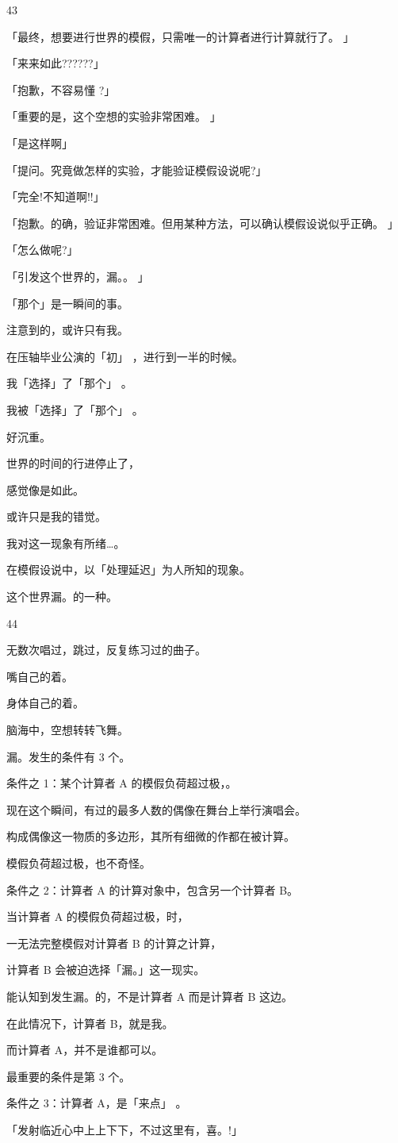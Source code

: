 43\par
「最终，想要进行世界的模假，只需唯一的计算者进行计算就行了。 」\par
「来来如此??????」\par
「抱歉，不容易懂 ?」\par
「重要的是，这个空想的实验非常困难。 」\par
「是这样啊」\par
「提问。究竟做怎样的实验，才能验证模假设说呢?」\par
「完全!不知道啊!!」\par
「抱歉。的确，验证非常困难。但用某种方法，可以确认模假设说似乎正确。 」\par
「怎么做呢?」\par
「引发这个世界的，漏。。 」\par
「那个」是一瞬间的事。\par
注意到的，或许只有我。\par
在压轴毕业公演的「初」 ，进行到一半的时候。\par
我「选择」了「那个」 。\par
我被「选择」了「那个」 。\par
好沉重。\par
世界的时间的行进停止了，\par
感觉像是如此。\par
或许只是我的错觉。\par
我对这一现象有所绪…。\par
在模假设说中，以「处理延迟」为人所知的现象。\par
这个世界漏。的一种。\par

44\par
无数次唱过，跳过，反复练习过的曲子。\par
嘴自己的着。\par
身体自己的着。\par
脑海中，空想转转飞舞。\par
漏。发生的条件有 3 个。\par
条件之 1：某个计算者 A 的模假负荷超过极，。\par
现在这个瞬间，有过的最多人数的偶像在舞台上举行演唱会。\par
构成偶像这一物质的多边形，其所有细微的作都在被计算。\par
模假负荷超过极，也不奇怪。\par
条件之 2：计算者 A 的计算对象中，包含另一个计算者 B。\par
当计算者 A 的模假负荷超过极，时，\par
一无法完整模假对计算者 B 的计算之计算，\par
计算者 B 会被迫选择「漏。」这一现实。\par
能认知到发生漏。的，不是计算者 A 而是计算者 B 这边。\par
在此情况下，计算者 B，就是我。\par
而计算者 A，并不是谁都可以。\par
最重要的条件是第 3 个。\par
条件之 3：计算者 A，是「来点」 。\par
「发射临近心中上上下下，不过这里有，喜。!」\par

